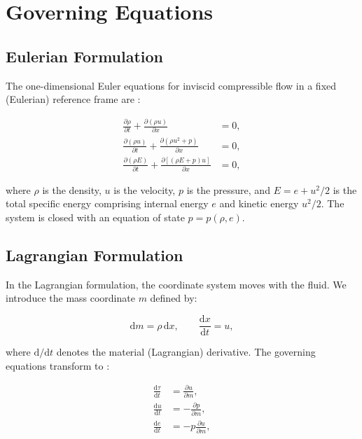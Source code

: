 \documentclass[12pt,a4paper]{article}
\newcommand{\dd}{\mathrm{d}}
\newcommand{\pp}{\partial}
\begin{document}
\section{Governing Equations}
\label{sec:governing}

\subsection{Eulerian Formulation}

The one-dimensional Euler equations for inviscid compressible flow in a fixed (Eulerian) reference frame are \citep{Toro2009}:

\begin{align}
    \frac{\pp \rho}{\pp t} + \frac{\pp (\rho u)}{\pp x} &= 0, \label{eq:euler_mass} \\
    \frac{\pp (\rho u)}{\pp t} + \frac{\pp (\rho u^2 + p)}{\pp x} &= 0, \label{eq:euler_momentum} \\
    \frac{\pp (\rho E)}{\pp t} + \frac{\pp [(\rho E + p) u]}{\pp x} &= 0, \label{eq:euler_energy}
\end{align}

\noindent where $\rho$ is the density, $u$ is the velocity, $p$ is the pressure, and $E = e + u^2/2$ is the total specific energy comprising internal energy $e$ and kinetic energy $u^2/2$. The system is closed with an equation of state $p = p(\rho, e)$.

\subsection{Lagrangian Formulation}

In the Lagrangian formulation, the coordinate system moves with the fluid. We introduce the mass coordinate $m$ defined by:

\begin{equation}
    \dd m = \rho \, \dd x, \qquad \frac{\dd x}{\dd t} = u,
    \label{eq:mass_coordinate}
\end{equation}

\noindent where $\dd/\dd t$ denotes the material (Lagrangian) derivative. The governing equations transform to \citep{Despres2017}:

\begin{align}
    \frac{\dd \tau}{\dd t} &= \frac{\pp u}{\pp m}, \label{eq:lagrange_mass} \\
    \frac{\dd u}{\dd t} &= -\frac{\pp p}{\pp m}, \label{eq:lagrange_momentum} \\
    \frac{\dd e}{\dd t} &= -p \frac{\pp u}{\pp m}, \label{eq:lagrange_energy}
\end{align}
\end{document}

